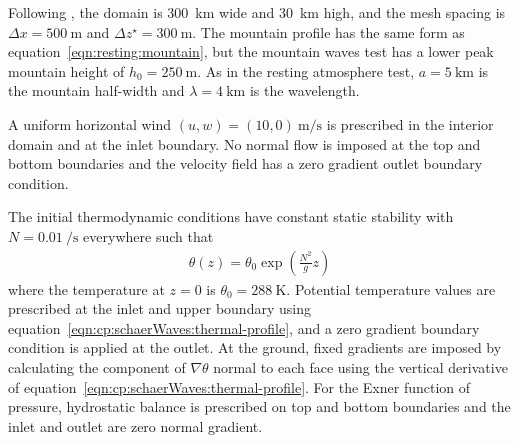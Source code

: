 Following \citet{melvin2010}, the domain is \SI{300}{\kilo\meter} wide and \SI{30}{\kilo\meter} high, and the mesh spacing is $\Delta x = \SI{500}{\meter}$ and $\Delta z^\star = \SI{300}{\meter}$.
The mountain profile has the same form as equation~\eqref{eqn:resting:mountain}, but the mountain waves test has a lower peak mountain height of $h_0 = \SI{250}{\meter}$.  As in the resting atmosphere test, $a = \SI{5}{\kilo\meter}$ is the mountain half-width and $\lambda = \SI{4}{\kilo\meter}$ is the wavelength.

A uniform horizontal wind $(u, w) = (10, 0)\:\si{\meter\per\second}$ is prescribed in the interior domain and at the inlet boundary.  No normal flow is imposed at the top and bottom boundaries and the velocity field has a zero gradient outlet boundary condition.

The initial thermodynamic conditions have constant static stability with $N = \SI{0.01}{\per\second}$ everywhere such that
\begin{align}
	\theta(z) = \theta_0 \exp \left( \frac{N^2}{g} z \right) \label{eqn:cp:schaerWaves:thermal-profile}
\end{align}
where the temperature at $z=0$ is $\theta_0 = \SI{288}{\kelvin}$.
Potential temperature values are prescribed at the inlet and upper boundary using equation~\eqref{eqn:cp:schaerWaves:thermal-profile}, and a zero gradient boundary condition is applied at the outlet.
At the ground, fixed gradients are imposed by calculating the component of $\nabla \theta$ normal to each face using the vertical derivative of equation~\eqref{eqn:cp:schaerWaves:thermal-profile}.
For the Exner function of pressure, hydrostatic balance is prescribed on top and bottom boundaries and the inlet and outlet are zero normal gradient.

